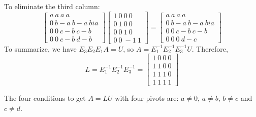 \documentclass[11pt]{article}
\begin{document}
To eliminate the third column:
$$\begin{bmatrix} a \ a \ a \ a \\ 0 \ b-a \ b-a \ bia \\ 0 \ 0 \ c-b \ c-b \\ 0 \ 0 \ c-b \ d-b \end{bmatrix}\begin{bmatrix} 1 \ 0 \ 0 \ 0 \\ 0 \ 1 \ 0 \ 0 \\ 0 \ 0 \ 1 \ 0 \\ 0 \ 0 \ -1 \ 1 \end{bmatrix} = \begin{bmatrix} a \ a \ a \ a \\ 0 \ b-a \ b-a \ bia \\ 0 \ 0 \ c-b \ c-b \\ 0 \ 0 \ 0 \ d-c \end{bmatrix}$$
To summarize, we have \(E_3E_2E_1A = U\), so \(A = E_1^{-1}E_2^{-1}E_3^{-1}U\). Therefore,
$$L = E_1^{-1}E_2^{-1}E_3^{-1} = \begin{bmatrix} 1 \ 0 \ 0 \ 0 \\ 1 \ 1 \ 0 \ 0 \\ 1 \ 1 \ 1 \ 0 \\ 1 \ 1 \ 1 \ 1\end{bmatrix}$$ 

The four conditions to get \(A = LU\) with four pivots are: \(a\neq0\), \(a\neq b\), \(b \neq c\) and \(c \neq d\).
\end{document}
